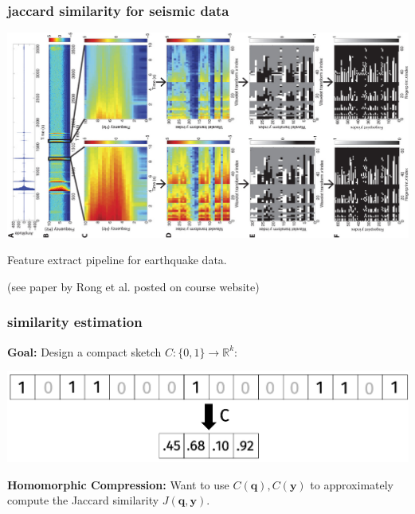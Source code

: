 \documentclass[compress]{beamer}
\newcommand{\bv}[1]{\mathbf{#1}}
\newcommand{\R}{\mathbb{R}}
\begin{document}
\begin{frame}
	\frametitle{jaccard similarity for seismic data}
	\begin{center}
			\vspace{-.5em}
			\includegraphics[width=.6\textwidth]{earthquakeFeatures.jpg}
			
			\vspace{-.5em}
			Feature extract pipeline for earthquake data.
			
			(see paper by Rong et al. posted on course website)
		\end{center}
\end{frame}


\begin{frame}
	\frametitle{similarity estimation}
	\textbf{Goal:} Design a compact sketch $C: \{0,1\}\rightarrow \R^k$:
	\begin{center}
		\vspace{-.5em}
		\includegraphics[width=.8\textwidth]{compression.png}
		\vspace{-.5em}
	\end{center}
	\textbf{Homomorphic Compression:} 
	Want to use $C(\bv{q}), C(\bv{y})$ to approximately compute the Jaccard similarity $J(\bv{q},\bv{y})$.
\end{frame}


\end{document}
